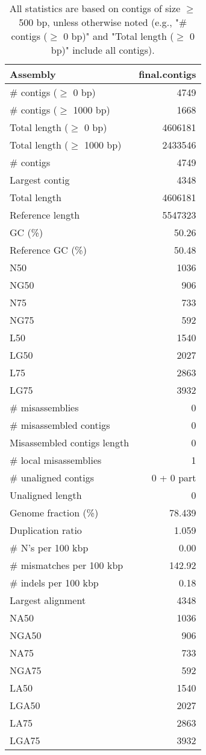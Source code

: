 \documentclass[12pt,a4paper]{article}
\begin{document}
\begin{table}[ht]
\begin{center}
\caption{All statistics are based on contigs of size $\geq$ 500 bp, unless otherwise noted (e.g., "\# contigs ($\geq$ 0 bp)" and "Total length ($\geq$ 0 bp)" include all contigs).}
\begin{tabular}{|l*{1}{|r}|}
\hline
Assembly & final.contigs \\ \hline
\# contigs ($\geq$ 0 bp) & 4749 \\ \hline
\# contigs ($\geq$ 1000 bp) & 1668 \\ \hline
Total length ($\geq$ 0 bp) & 4606181 \\ \hline
Total length ($\geq$ 1000 bp) & 2433546 \\ \hline
\# contigs & 4749 \\ \hline
Largest contig & 4348 \\ \hline
Total length & 4606181 \\ \hline
Reference length & 5547323 \\ \hline
GC (\%) & 50.26 \\ \hline
Reference GC (\%) & 50.48 \\ \hline
N50 & 1036 \\ \hline
NG50 & 906 \\ \hline
N75 & 733 \\ \hline
NG75 & 592 \\ \hline
L50 & 1540 \\ \hline
LG50 & 2027 \\ \hline
L75 & 2863 \\ \hline
LG75 & 3932 \\ \hline
\# misassemblies & 0 \\ \hline
\# misassembled contigs & 0 \\ \hline
Misassembled contigs length & 0 \\ \hline
\# local misassemblies & 1 \\ \hline
\# unaligned contigs & 0 + 0 part \\ \hline
Unaligned length & 0 \\ \hline
Genome fraction (\%) & 78.439 \\ \hline
Duplication ratio & 1.059 \\ \hline
\# N's per 100 kbp & 0.00 \\ \hline
\# mismatches per 100 kbp & 142.92 \\ \hline
\# indels per 100 kbp & 0.18 \\ \hline
Largest alignment & 4348 \\ \hline
NA50 & 1036 \\ \hline
NGA50 & 906 \\ \hline
NA75 & 733 \\ \hline
NGA75 & 592 \\ \hline
LA50 & 1540 \\ \hline
LGA50 & 2027 \\ \hline
LA75 & 2863 \\ \hline
LGA75 & 3932 \\ \hline
\end{tabular}
\end{center}
\end{table}
\end{document}
